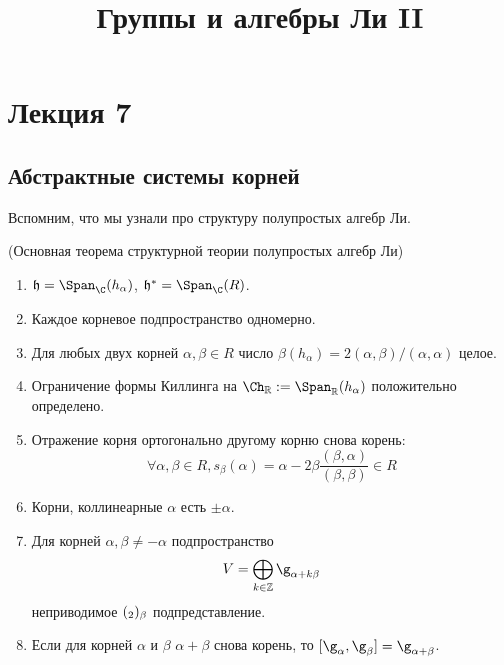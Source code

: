 \documentclass[a4article]{article}
\title{Группы и алгебры Ли II}
\author{}
\date{}
\begin{document}
\maketitle

\section*{Лекция 7}



\subsection*{Абстрактные системы корней}
Вспомним, что мы узнали про структуру полупростых алгебр Ли.
\begin{theorem}
    (Основная теорема структурной теории полупростых алгебр Ли)
    \begin{enumerate}
        \item $\mathfrak{h} = \Span_\C (h_\alpha)$, $\mathfrak{h}^* = \Span_\C (R)$.

        \item Каждое корневое подпространство одномерно.
        
        \item Для любых двух корней $\alpha, \beta \in R$ число $\beta(h_\alpha) = 2 (\alpha, \beta) / (\alpha, \alpha)$ целое.

        \item Ограничение формы Киллинга на $\Ch_\mathbb{R} := \Span_{\mathbb R} (h_\alpha)$ положительно определено.

        \item Отражение корня ортогонально другому корню снова корень:
        $$ \forall \alpha, \beta \in R, s_\beta(\alpha) = \alpha - 2 \beta \frac{(\beta, \alpha)}{(\beta, \beta)} \in R $$

        \item Корни, коллинеарные $\alpha$ есть $\pm \alpha$.

        \item Для корней $\alpha, \beta \not = -\alpha$ подпространство
        $$ V = \bigoplus_{k\in\mathbb Z} \g_{\alpha +k\beta} $$
        неприводимое $(\sl_2)_\beta$ подпредставление. 

        \item Если для корней $\alpha$ и $\beta$ $\alpha+\beta$ снова корень, то $[\g_\alpha, \g_\beta] = \g_{\alpha+\beta}$.
    \end{enumerate}
\end{theorem}
\end{document}
